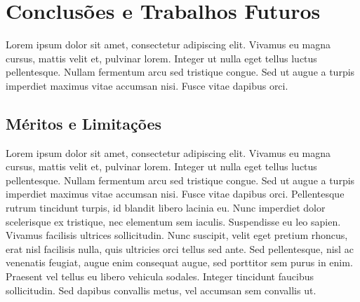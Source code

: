 \chapter{Conclusões e Trabalhos Futuros}
\label{chap:conclusoes_trabalhos_futuros}

Lorem ipsum dolor sit amet, consectetur adipiscing elit. Vivamus eu magna cursus, mattis velit et, pulvinar lorem. Integer ut nulla eget tellus luctus pellentesque. Nullam fermentum arcu sed tristique congue. Sed ut augue a turpis imperdiet maximus vitae accumsan nisi. Fusce vitae dapibus orci.

\section{Méritos e Limitações}

Lorem ipsum dolor sit amet, consectetur adipiscing elit. Vivamus eu magna cursus, mattis velit et, pulvinar lorem. Integer ut nulla eget tellus luctus pellentesque. Nullam fermentum arcu sed tristique congue. Sed ut augue a turpis imperdiet maximus vitae accumsan nisi. Fusce vitae dapibus orci. Pellentesque rutrum tincidunt turpis, id blandit libero lacinia eu. Nunc imperdiet dolor scelerisque ex tristique, nec elementum sem iaculis. Suspendisse eu leo sapien. Vivamus facilisis ultrices sollicitudin. Nunc suscipit, velit eget pretium rhoncus, erat nisl facilisis nulla, quis ultricies orci tellus sed ante. Sed pellentesque, nisl ac venenatis feugiat, augue enim consequat augue, sed porttitor sem purus in enim. Praesent vel tellus eu libero vehicula sodales. Integer tincidunt faucibus sollicitudin. Sed dapibus convallis metus, vel accumsan sem convallis ut.

